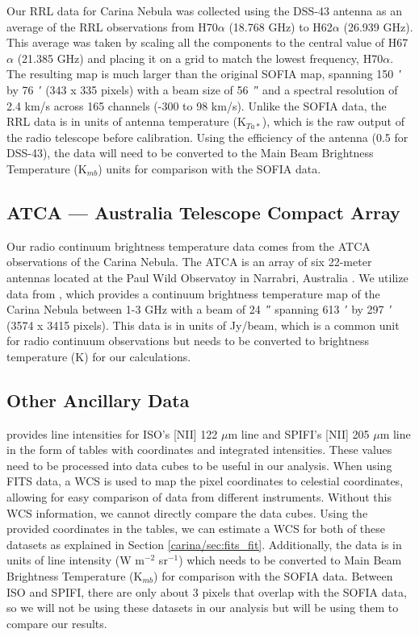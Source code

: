Our RRL data for Carina Nebula was collected using the DSS-43 antenna as an average of the RRL observations from H70$\alpha$ (18.768 GHz) to H62$\alpha$ (26.939 GHz).
This average was taken by scaling all the components to the central value of H67$\alpha$ (21.385 GHz) and placing it on a grid to match the lowest frequency, H70$\alpha$.
The resulting map is much larger than the original SOFIA map, spanning \qty{150}{\arcminute} by \qty{76}{\arcminute} (343 x 335 pixels) with a beam size of \qty{56}{\arcsecond} and a spectral resolution of 2.4 km/s across 165 channels (-300 to 98 km/s).
Unlike the SOFIA data, the RRL data is in units of antenna temperature (K$_{Ta*}$), which is the raw output of the radio telescope before calibration.
Using the efficiency of the antenna (0.5 for DSS-43), the data will need to be converted to the Main Beam Brightness Temperature (K$_{mb}$) units for comparison with the SOFIA data.

\subsection{ATCA --- Australia Telescope Compact Array}
Our radio continuum brightness temperature data comes from the ATCA observations of the Carina Nebula.
The ATCA is an array of six 22-meter antennas located at the Paul Wild Observatoy in Narrabri, Australia \cite{Rebolledo_2021}.
We utilize data from \cite{Rebolledo_2021}, which provides a continuum brightness temperature map of the Carina Nebula between 1-3 GHz with a beam of \qty{24}{\arcsecond} spanning \qty{613}{\arcminute} by \qty{297}{\arcminute} (3574 x 3415 pixels).
This data is in units of Jy/beam, which is a common unit for radio continuum observations but needs to be converted to brightness temperature (K) for our calculations.

\subsection{Other Ancillary Data}
\cite{oberst2011205} provides line intensities for ISO's [NII] 122 $\mu$m line and SPIFI's [NII] 205 $\mu$m line in the form of tables with coordinates and integrated intensities.
These values need to be processed into data cubes to be useful in our analysis.
When using FITS data, a WCS is used to map the pixel coordinates to celestial coordinates, allowing for easy comparison of data from different instruments.
Without this WCS information, we cannot directly compare the data cubes.
Using the provided coordinates in the tables, we can estimate a WCS for both of these datasets as explained in Section \ref{carina/sec:fits_fit}.
Additionally, the data is in units of line intensity (W m$^{-2}$ sr$^{-1}$) which needs to be converted to Main Beam Brightness Temperature (K$_{mb}$) for comparison with the SOFIA data.
Between ISO and SPIFI, there are only about 3 pixels that overlap with the SOFIA data, so we will not be using these datasets in our analysis but will be using them to compare our results.

